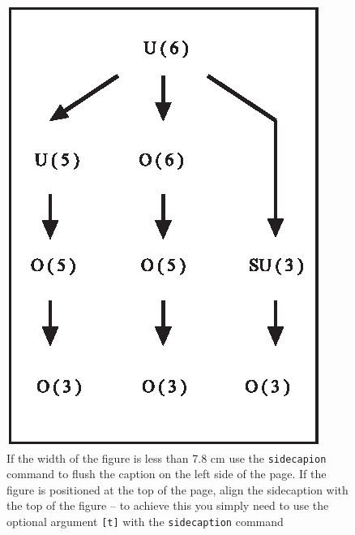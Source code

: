 \documentclass[graybox]{svmult}
\begin{document}
\begin{figure}[t]
\sidecaption[t]
\includegraphics[scale=.65]{figure}
%
%
\caption{If the width of the figure is less than 7.8 cm use the \texttt{sidecapion} command to flush the caption on the left side of the page. If the figure is positioned at the top of the page, align the sidecaption with the top of the figure -- to achieve this you simply need to use the optional argument \texttt{[t]} with the \texttt{sidecaption} command}
\label{fig:2}       %
\end{figure}
\end{document}
